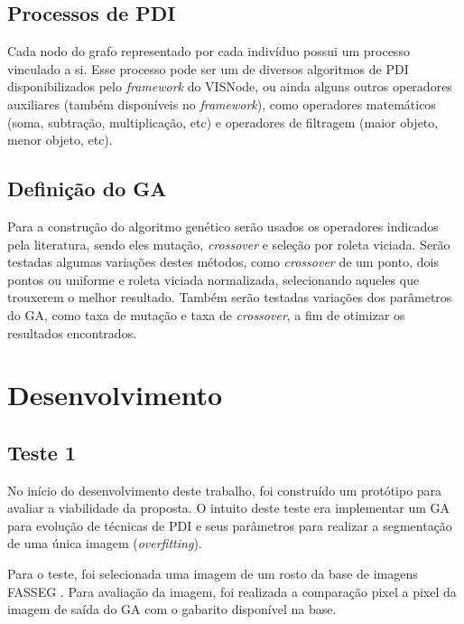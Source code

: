 \documentclass[12pt,oneside,a4paper,english,french,spanish,brazil,]{abntex2}
\begin{document}
\section{Processos de PDI}

Cada nodo do grafo representado por cada indivíduo possui um processo vinculado a si. Esse processo pode ser um de diversos algoritmos de PDI disponibilizados pelo \textit{framework} do VISNode, ou ainda alguns outros operadores auxiliares (também disponíveis no \textit{framework}), como operadores matemáticos (soma, subtração, multiplicação, etc) e operadores de filtragem (maior objeto, menor objeto, etc).

\section{Definição do GA}

Para a construção do algoritmo genético serão usados os operadores indicados pela literatura, sendo eles mutação, \textit{crossover} e seleção por roleta viciada. Serão testadas algumas variações destes métodos, como \textit{crossover} de um ponto, dois pontos ou uniforme e roleta viciada normalizada, selecionando aqueles que trouxerem o melhor resultado. Também serão testadas variações dos parâmetros do GA, como taxa de mutação e taxa de \textit{crossover}, a fim de otimizar os resultados encontrados.

\chapter{Desenvolvimento}
\label{chap:Desenvolvimento}

\section{Teste 1}

No início do desenvolvimento deste trabalho, foi construído um protótipo para avaliar a viabilidade da proposta. O intuito deste teste era implementar um GA para evolução de técnicas de PDI e seus parâmetros para realizar a segmentação de uma única imagem (\textit{overfitting}).

Para o teste, foi selecionada uma imagem de um rosto da base de imagens FASSEG \cite{fasseg:2018}. Para avaliação da imagem, foi realizada a comparação pixel a pixel da imagem de saída do GA com o gabarito disponível na base.
\end{document}
